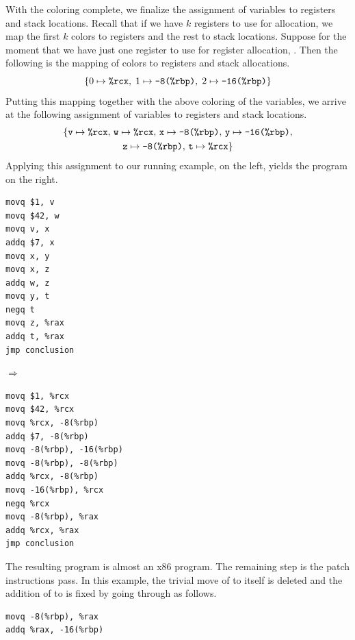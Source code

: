 \documentclass[11pt]{book}
\begin{document}
With the coloring complete, we finalize the assignment of variables to
registers and stack locations. Recall that if we have $k$ registers to
use for allocation, we map the first $k$ colors to registers and the
rest to stack locations.  Suppose for the moment that we have just one
register to use for register allocation, . Then the following
is the mapping of colors to registers and stack allocations.
\[
  \{ 0 \mapsto \texttt{\%rcx}, \; 1 \mapsto \texttt{-8(\%rbp)}, \; 2 \mapsto \texttt{-16(\%rbp)} \}
\]
Putting this mapping together with the above coloring of the
variables, we arrive at the following assignment of variables to
registers and stack locations.
\begin{gather*}
  \{ \mathtt{v} \mapsto \texttt{\%rcx}, \,
     \mathtt{w} \mapsto \texttt{\%rcx},  \,
     \mathtt{x} \mapsto \texttt{-8(\%rbp)}, \,
     \mathtt{y} \mapsto \texttt{-16(\%rbp)}, \\
     \mathtt{z} \mapsto \texttt{-8(\%rbp)}, \,
     \mathtt{t} \mapsto \texttt{\%rcx} \}
\end{gather*}
Applying this assignment to our running example, on the left, yields
the program on the right.
\begin{center}
  \begin{minipage}{0.3\textwidth}
\begin{lstlisting}
movq $1, v
movq $42, w
movq v, x
addq $7, x
movq x, y
movq x, z
addq w, z
movq y, t
negq t
movq z, %rax
addq t, %rax
jmp conclusion
\end{lstlisting}
\end{minipage}
$\Rightarrow\qquad$
\begin{minipage}{0.45\textwidth}
\begin{lstlisting}
movq $1, %rcx
movq $42, %rcx
movq %rcx, -8(%rbp)
addq $7, -8(%rbp)
movq -8(%rbp), -16(%rbp)
movq -8(%rbp), -8(%rbp)
addq %rcx, -8(%rbp)
movq -16(%rbp), %rcx
negq %rcx
movq -8(%rbp), %rax
addq %rcx, %rax
jmp conclusion
\end{lstlisting}
\end{minipage}
\end{center}

The resulting program is almost an x86 program. The remaining step is
the patch instructions pass. In this example, the trivial move of
 to itself is deleted and the addition of
 to  is fixed by going through
 as follows.
\begin{lstlisting}
movq -8(%rbp), %rax
addq %rax, -16(%rbp)
\end{lstlisting}
\end{document}
